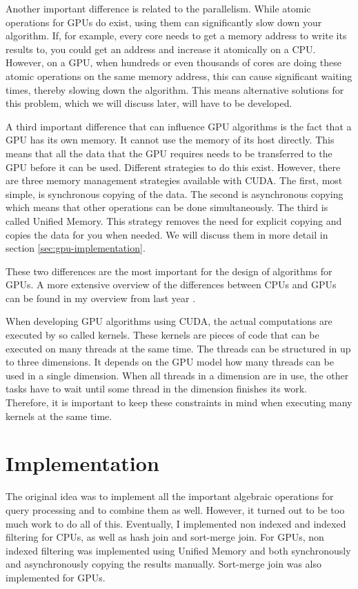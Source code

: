 \documentclass[a4paper,titlepage]{article}
\begin{document}
Another important difference is related to the parallelism. While atomic operations for GPUs do exist, using them can significantly slow down your algorithm. If, for example, every core needs to get a memory address to write its results to, you could get an address and increase it atomically on a CPU. However, on a GPU, when hundreds or even thousands of cores are doing these atomic operations on the same memory address, this can cause significant waiting times, thereby slowing down the algorithm. This means alternative solutions for this problem, which we will discuss later, will have to be developed.

A third important difference that can influence GPU algorithms is the fact that a GPU has its own memory. It cannot use the memory of its host directly. This means that all the data that the GPU requires needs to be transferred to the GPU before it can be used. Different strategies to do this exist. However, there are three memory management strategies available with CUDA. The first, most simple, is synchronous copying of the data. The second is asynchronous copying which means that other operations can be done simultaneously. The third is called Unified Memory. This strategy removes the need for explicit copying and copies the data for you when needed. We will discuss them in more detail in section \ref{sec:gpu-implementation}.

These two differences are the most important for the design of algorithms for GPUs. A more extensive overview of the differences between CPUs and GPUs can be found in my overview from last year \cite{kostjens2015}.

When developing GPU algorithms using CUDA, the actual computations are executed by so called kernels. These kernels are pieces of code that can be executed on many threads at the same time. The threads can be structured in up to three dimensions. It depends on the GPU model how many threads can be used in a single dimension. When all threads in a dimension are in use, the other tasks have to wait until some thread in the dimension finishes its work. Therefore, it is important to keep these constraints in mind when executing many kernels at the same time.

\section{Implementation}
\label{sec:implementation}
The original idea was to implement all the important algebraic operations for query processing and to combine them as well. However, it turned out to be too much work to do all of this. Eventually, I implemented non indexed and indexed filtering for CPUs, as well as hash join and sort-merge join. For GPUs, non indexed filtering was implemented using Unified Memory and both synchronously and asynchronously copying the results manually. Sort-merge join was also implemented for GPUs.
\end{document}
